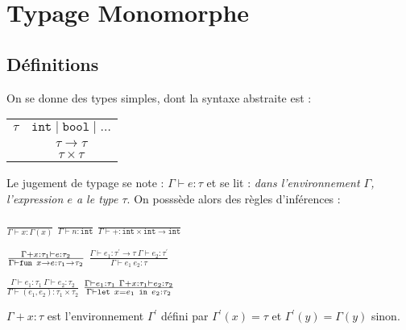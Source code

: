\documentclass{cours}
\begin{document}
\section{Typage Monomorphe}
\subsection{Définitions}
On se donne des types simples, dont la syntaxe abstraite est :
\begin{tabular}{c@{$\mid$}c}
    $\tau$ & $\texttt{int} \mid \texttt{bool} \mid \ldots$ \\
           & $\tau \rightarrow \tau$                       \\
           & $\tau \times \tau$
\end{tabular}

Le jugement de typage se note : $\Gamma \vdash e :\tau$ et se lit : \textsl{dans l'environnement $\Gamma$, l'expression $e$ a le type $\tau$}.
On posssède alors des règles d'inférences :
\begin{center}
    $\frac{}{\Gamma \vdash x : \Gamma(x)}$
    $\frac{}{\Gamma \vdash n : \texttt{int}}$
    $\frac{}{\Gamma \vdash + : \texttt{int} \times \texttt{int} \rightarrow \texttt{int}}$
\end{center}
\begin{center}
    $\frac{\Gamma + x : \tau_{1} \vdash e : \tau_{2}}{\Gamma \vdash \texttt{fun } x \rightarrow e:\tau_{1}\rightarrow\tau_{2}}$
    $\frac{\Gamma \vdash e_{1} : \tau^{'}\rightarrow\tau \ \Gamma \vdash e_{2} : \tau^{'}}{\Gamma \vdash e_{1}\ e_{2} : \tau}$
\end{center}
\begin{center}
    $\frac{\Gamma \vdash e_{1} : \tau_{1} \ \Gamma \vdash e_{2} : \tau_{2}}{\Gamma \vdash (e_{1},e_{2}) : \tau_{1} \times \tau_{2}}$
    $\frac{\Gamma \vdash e_{1} : \tau_{1} \ \Gamma + x : \tau_{1} \vdash e_{2} : \tau_{2}}{\Gamma \vdash \texttt{let } x = e_{1} \texttt{ in } e_{2} : \tau_{2}}$
\end{center}
$\Gamma + x : \tau$ est l'environnement $\Gamma^{'}$ défini par $\Gamma^{'}(x) = \tau$ et $\Gamma^{'}(y) = \Gamma(y)$ sinon.
\end{document}

